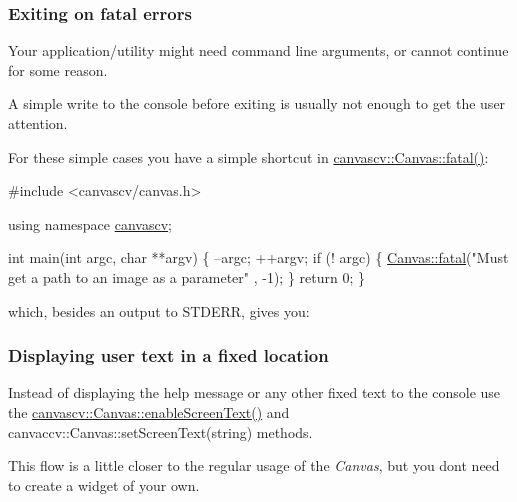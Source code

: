 \hypertarget{tutscreentext_screentext_s2_1}{}\subsubsection{Exiting on fatal errors}\label{tutscreentext_screentext_s2_1}
Your application/utility might need command line arguments, or cannot continue for some reason.

A simple write to the console before exiting is usually not enough to get the user attention.

For these simple cases you have a simple shortcut in \hyperlink{classcanvascv_1_1Canvas_add93c0d5cc1e9b49f97510952a8a1961}{canvascv\+::\+Canvas\+::fatal()}\+: 
\begin{DoxyCode}
\textcolor{preprocessor}{#include <canvascv/canvas.h>}

\textcolor{keyword}{using namespace }\hyperlink{namespacecanvascv}{canvascv};

\textcolor{keywordtype}{int} main(\textcolor{keywordtype}{int} argc, \textcolor{keywordtype}{char} **argv)
\{
    --argc;
    ++argv;
    \textcolor{keywordflow}{if} (! argc)
    \{
        \hyperlink{classcanvascv_1_1Canvas_add93c0d5cc1e9b49f97510952a8a1961}{Canvas::fatal}(\textcolor{stringliteral}{"Must get a path to an image as a parameter"} , -1);
    \}
    \textcolor{keywordflow}{return} 0;
\}
\end{DoxyCode}


which, besides an output to S\+T\+D\+E\+RR, gives you\+:  ~\newline
\hypertarget{tutscreentext_screentext_s2_2}{}\subsubsection{Displaying user text in a fixed location}\label{tutscreentext_screentext_s2_2}
Instead of displaying the help message or any other fixed text to the console use the \hyperlink{classcanvascv_1_1Canvas_ae68d3277e738d349232400b38f0e5f9e}{canvascv\+::\+Canvas\+::enable\+Screen\+Text()} and canvaccv\+::\+Canvas\+::set\+Screen\+Text(string) methods.

This flow is a little closer to the regular usage of the {\itshape Canvas}, but you don\textquotesingle{}t need to create a widget of your own.

